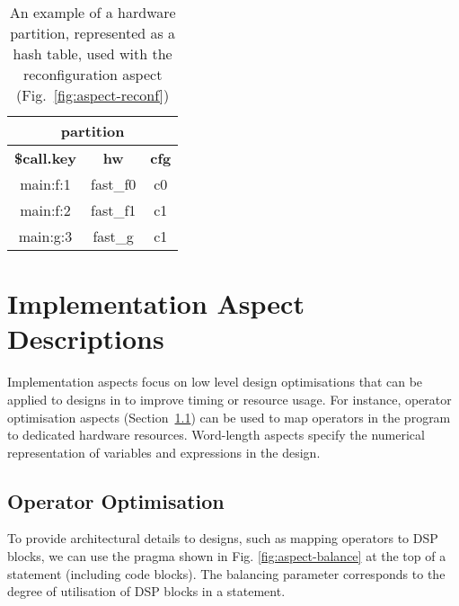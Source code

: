 \begin{table}[!h]
\caption{An example of a hardware partition, represented as a hash
  table, used with the reconfiguration aspect
  (Fig.~\ref{fig:aspect-reconf})}
\label{fig:aspect-hash}
\centering
\begin{tabular}{c|c|c}
\hline
\multicolumn{3}{c}{\bf{partition}} \\
\hline
\bf{\$call.key} & \bf{hw} & \bf{cfg}  \\
\hline
main:f:1 & fast\_f0 & c0 \\
main:f:2 & fast\_f1 & c1 \\
main:g:3 & fast\_g & c1 \\
\hline
\end{tabular}
\end{table}
\begin{comment}
\subsection{Feedback Aspects}
Used to complement predicted model data (such as resource usage) from
back-end compilation reports or execution of automated performance
test suites. This improves estimates (e.g. for reconfiguration cost /
performance improvement etc.)
\end{comment}

\section{Implementation Aspect Descriptions}

Implementation aspects focus on
low level design optimisations that can be applied to designs in
\FAST{} to improve timing or resource usage. For instance, operator
optimisation aspects (Section~\ref{sect:asp_ops}) can be used to map
operators in the program to dedicated hardware resources. Word-length
aspects specify the numerical representation of variables and
expressions in the design.




\subsection{Operator Optimisation}
\label{sect:asp_ops}
To provide architectural details to \FAST{} designs, such as mapping
operators to DSP blocks, we can use the \FAST{} pragma shown in
Fig. \ref{fig:aspect-balance} at the top of a statement (including code
blocks). The balancing parameter corresponds to the degree of
utilisation of DSP blocks in a statement.

